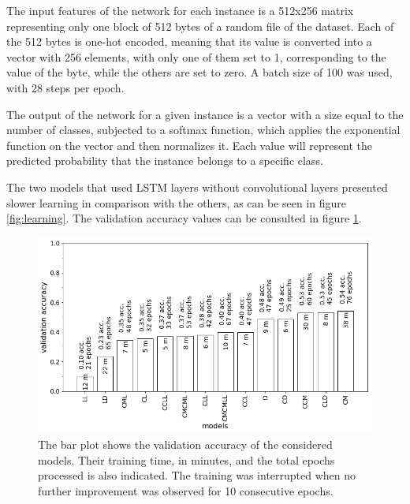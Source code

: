 The input features of the network for each instance is a 512x256 matrix representing only one block of 512 bytes of a random file of the dataset. Each of the 512 bytes is one-hot encoded, meaning that its value is converted into a vector with 256 elements, with only one of them set to 1, corresponding to the value of the byte, while the others are set to zero. A batch size of 100 was used, with 28 steps per epoch.


The output of the network for a given instance is a vector with a size equal to the number of classes, subjected to a softmax function, which applies the exponential function on the vector and then normalizes it. Each value will represent the predicted probability that the instance belongs to a specific class.

The two models that used LSTM layers without convolutional layers presented slower learning in comparison with the others, as can be seen in figure \ref{fig:learning}. The validation accuracy values can be consulted in figure \ref{fig:models}.


\noindent
\begin{figure}[htb!]
\centering\includegraphics[width=1.0\textwidth]{content/models.png}
\caption{\label{fig:models}The bar plot shows the validation accuracy of the considered models. Their training time, in minutes, and the total epochs processed is also indicated. The training was interrupted when no further improvement was observed for 10 consecutive epochs.}%
\end{figure}


